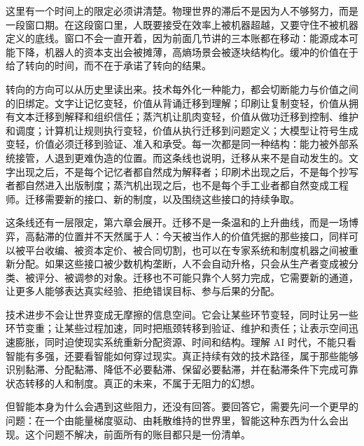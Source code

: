这里有一个时间上的限定必须讲清楚。物理世界的滞后不是因为人不够努力，而是一段窗口期。在这段窗口里，人既要接受在效率上被机器超越，又要守住不被机器定义的底线。窗口不会一直开着，因为前面几节讲的三本账都在移动：能源成本可能下降，机器人的资本支出会被摊薄，高熵场景会被逐块结构化。缓冲的价值在于给了转向的时间，而不在于承诺了转向的结果。

转向的方向可以从历史里读出来。技术每外化一种能力，都会切断能力与价值之间的旧绑定。文字让记忆变轻，价值从背诵迁移到理解；印刷让复制变轻，价值从拥有文本迁移到解释和组织信任；蒸汽机让肌肉变轻，价值从做功迁移到控制、维护和调度；计算机让规则执行变轻，价值从执行迁移到问题定义；大模型让符号生成变轻，价值必须迁移到验证、准入和承受。每一次都是同一种结构：能力被外部系统接管，人退到更难伪造的位置。而这条线也说明，迁移从来不是自动发生的。文字出现之后，不是每个记忆者都自然成为解释者；印刷术出现之后，不是每个抄写者都自然进入出版制度；蒸汽机出现之后，也不是每个手工业者都自然变成工程师。迁移需要新的接口、新的制度，以及围绕这些接口的持续争取。

这条线还有一层限定，第六章会展开。迁移不是一条温和的上升曲线，而是一场博弈，高黏滞的位置并不天然属于人：今天被当作人的价值凭据的那些接口，同样可以被平台收编、被资本定价、被合同切割，也可以在专家系统和制度机器之间被重新分配。如果这些接口被少数机构垄断，人不会自动升格，只会从生产者变成被分类、被评分、被调参的对象。迁移也不可能只靠个人努力完成，它需要新的通道，让更多人能够表达真实经验、拒绝错误目标、参与后果的分配。

技术进步不会让世界变成无摩擦的信息空间。它会让某些环节变轻，同时让另一些环节变重；让某些过程加速，同时把瓶颈转移到验证、维护和责任；让表示空间迅速膨胀，同时迫使现实系统重新分配资源、时间和结构。理解 AI 时代，不能只看智能有多强，还要看智能如何穿过现实。真正持续有效的技术路径，属于那些能够识别黏滞、分配黏滞、降低不必要黏滞、保留必要黏滞，并在黏滞条件下完成可靠状态转移的人和制度。真正的未来，不属于无阻力的幻想。

但智能本身为什么会遇到这些阻力，还没有回答。要回答它，需要先问一个更早的问题：在一个由能量梯度驱动、由耗散维持的世界里，智能这种东西为什么会出现。这个问题不解决，前面所有的账目都只是一份清单。





\printbibliography[heading=subbibliography,title=参考文献]
